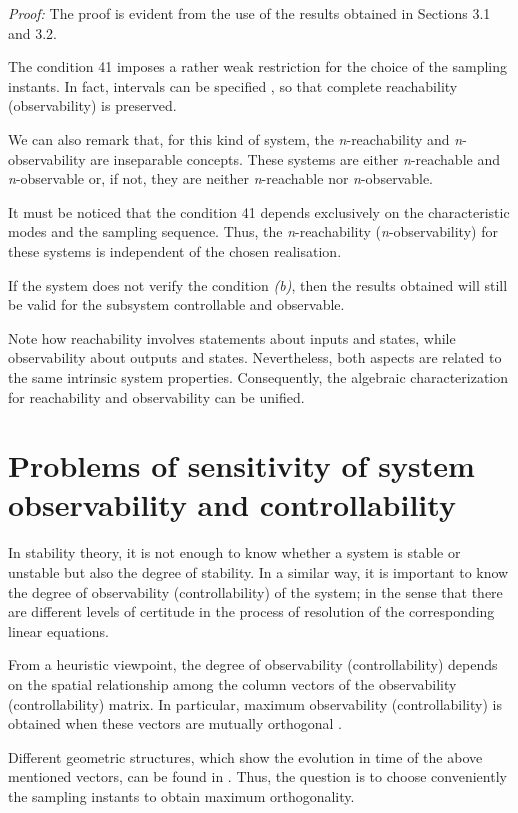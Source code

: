 \documentclass{article}
\begin{document}
\textit{Proof:} The
proof is evident from the use of the results obtained in Sections
3.1 and 3.2.

The condition 41 imposes a rather weak restriction
for the choice of the sampling instants. In fact, intervals can be
specified \cite{Fuster}, \cite{Troch} so that complete reachability (observability) is
preserved.

We can also remark that, for this kind of system, the
\textit{n}-reachability and \textit{n}-observability are inseparable concepts. These
systems are either \textit{n}-reachable and \textit{n}-observable or, if not, they
are neither \textit{n}-reachable nor \textit{n}-observable.

It must be noticed that
the condition 41 depends exclusively on the characteristic modes
and the sampling sequence. Thus, the \textit{n}-reachability
(\textit{n}-observability) for these systems is independent of the chosen
realisation.

If the system does not verify the condition \textit{(b)}, then
the results obtained will still be valid for the subsystem
controllable and observable.

Note how reachability involves
statements about inputs and states, while observability about outputs
and states. Nevertheless, both aspects are related to the same
intrinsic system properties. Consequently, the algebraic
characterization for reachability and observability can be
unified.


\section{Problems of sensitivity of system observability and controllability}
In stability theory, it is not enough to know whether a system is
stable or unstable but also the degree of stability. In a similar
way, it is important to know the degree of observability
(controllability) of the system; in the sense that there are
different levels of certitude in the process of resolution of the
corresponding linear equations.

From a heuristic viewpoint, the degree of observability
(controllability) depends on the spatial relationship among the
column vectors of the observability (controllability) matrix. In
particular, maximum observability (controllability) is obtained
when these vectors are mutually orthogonal \cite{Troch}.

Different geometric structures, which show the
evolution in time of the above mentioned vectors, can be found in
\cite{Fuster}. Thus, the question is to choose conveniently the
sampling instants to obtain maximum orthogonality.
\end{document}

